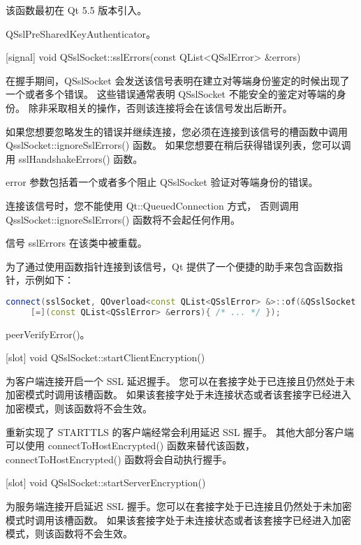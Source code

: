 该函数最初在 Qt 5.5 版本引入。

\begin{seeAlso}
QSslPreSharedKeyAuthenticator。
\end{seeAlso}

[signal] void QSslSocket::sslErrors(const QList<QSslError> \&errors)

在握手期间，QSslSocket 会发送该信号表明在建立对等端身份鉴定的时候出现了一个或者多个错误。
这些错误通常表明 QSslSocket 不能安全的鉴定对等端的身份。
除非采取相关的操作，否则该连接将会在该信号发出后断开。

如果您想要忽略发生的错误并继续连接，您必须在连接到该信号的槽函数中调用 QsslSocket::ignoreSslErrors() 函数。
如果您想要在稍后获得错误列表，您可以调用 sslHandshakeErrors() 函数。

error 参数包括着一个或者多个阻止 QSslSocket 验证对等端身份的错误。

\begin{notice}
连接该信号时，您不能使用 Qt::QueuedConnection 方式，
否则调用 QsslSocket::ignoreSslErrors() 函数将不会起任何作用。
\end{notice}

\begin{notice}
信号 sslErrors 在该类中被重载。
\end{notice}

为了通过使用函数指针连接到该信号，Qt 提供了一个便捷的助手来包含函数指针，示例如下：

\begin{lstlisting}[language=C++]
connect(sslSocket, QOverload<const QList<QSslError> &>::of(&QSslSocket::sslErrors),
     [=](const QList<QSslError> &errors){ /* ... */ });
\end{lstlisting}

\begin{seeAlso}
peerVerifyError()。
\end{seeAlso}

[slot] void QSslSocket::startClientEncryption()

为客户端连接开启一个 SSL 延迟握手。
您可以在套接字处于已连接且仍然处于未加密模式时调用该槽函数。
如果该套接字处于未连接状态或者该套接字已经进入加密模式，则该函数将不会生效。

重新实现了 STARTTLS 的客户端经常会利用延迟 SSL 握手。
其他大部分客户端可以使用 connectToHostEncrypted() 函数来替代该函数，
connectToHostEncrypted() 函数将会自动执行握手。

[slot] void QSslSocket::startServerEncryption()

为服务端连接开启延迟 SSL 握手。您可以在套接字处于已连接且仍然处于未加密模式时调用该槽函数。
如果该套接字处于未连接状态或者该套接字已经进入加密模式，则该函数将不会生效。

